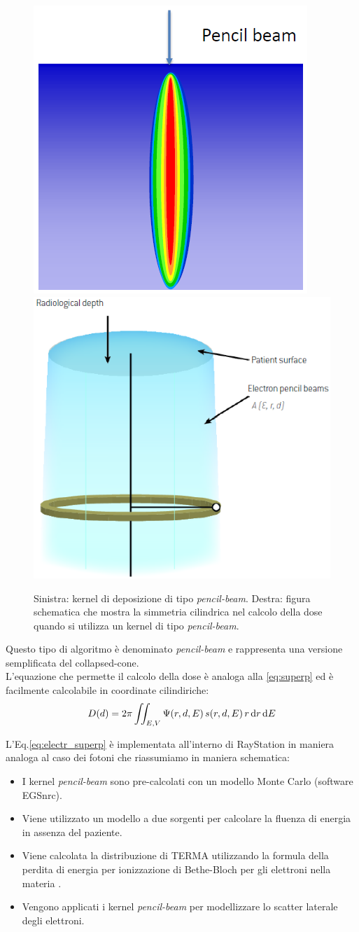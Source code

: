 {\begin{figure}
\centering
\includegraphics[width=.4\textwidth]{./cap1/electr_pencil.png}$\qquad$
\includegraphics[width=.45\textwidth]{./cap1/electr_pencil_b.png}
\caption{Sinistra: kernel di deposizione di tipo \textit{pencil-beam}. Destra: figura schematica che mostra la simmetria cilindrica nel calcolo della dose quando si utilizza un kernel di tipo \textit{pencil-beam}.}
\label{fig:electr_pencil}
\end{figure}


Questo tipo di algoritmo è denominato \textit{pencil-beam} e rappresenta una versione semplificata del collapsed-cone.\\
L'equazione che permette il calcolo della dose è analoga alla \eqref{eq:superp} ed è facilmente calcolabile in coordinate cilindiriche:
\begin{equation}
\label{eq:electr_superp}
D(d) = 2\pi \iint_{E,V} \Psi(r,d,E)\, s(r,d,E)\, r\,\text{d} r \,\text{d} E
\end{equation}

L'Eq.\eqref{eq:electr_superp} è implementata all'interno di RayStation in maniera analoga al caso dei fotoni che riassumiamo in maniera schematica:
\begin{itemize}
\item I kernel \textit{pencil-beam} sono pre-calcolati con un modello Monte Carlo (software EGSnrc).
\item Viene utilizzato un modello a due sorgenti per calcolare la fluenza di energia in assenza del paziente.
\item Viene calcolata la distribuzione di TERMA utilizzando la formula della perdita di energia per ionizzazione di Bethe-Bloch per gli elettroni nella materia \cite{RaySearchLaboratories2014}.
\item Vengono applicati i kernel \textit{pencil-beam} per modellizzare lo scatter laterale degli elettroni.
\end{itemize}

}
